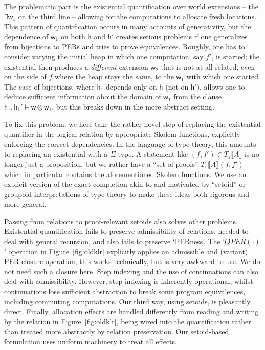 \documentclass[orivec]{llncs}
\newcommand{\eff}{\varepsilon}
\newcommand{\sem}[1]{\ensuremath{\llbracket {#1} \rrbracket}}
\newcommand\w{\ensuremath{\mathsf{w}}\xspace}
\newcommand\heap{\ensuremath{\mathsf{h}}\xspace}
\begin{document}
The problematic part
is the existential quantification over world extensions -- the
$\exists \w_1$ on the third line -- allowing for the computations
to allocate fresh locations.
This pattern of
quantification occurs in many accounts of generativity, but
the dependence of $\w_1$ on both $\heap$ and $\heap'$ creates serious problems
if one generalizes from bijections to PERs
and tries to prove equivalences.
Roughly, one has to consider varying the initial heap in
which one computation, say $f'$, is started; the
existential then produces a \emph{different} extension $\w_2$
that is
not at all related, even on the side of $f$ where the
heap stays the same, to the $\w_1$ with which one started. The
case of bijections, where $\heap_1$ depends only on
$\heap$ (not on $\heap'$), allows one to deduce sufficient information
about the domain of $\w_1$ from the clause $\heap_1,\heap_1'\models \w\otimes\w_1$,
but this breaks down in the more abstract setting.

To fix this problem, we here
take the rather novel step of replacing the existential
quantifier in the logical relation by appropriate Skolem functions,
explicitly enforcing the correct dependencies. In the language of
type theory, this amounts to replacing an existential  with
a $\Sigma$-type. A statement like $(f,f')\in T_\eff\sem{A}$ is no
longer just a proposition, but we rather have a ``set of
proofs'' $T_\eff\sem{A}(f,f')$ which in particular contains
the aforementioned Skolem functions. We use an explicit version of the 
exact-completion \cite{DBLP:conf/mfps/CarboniFS87,DBLP:conf/lics/BirkedalCRS98} akin to and motivated by ``setoid'' or groupoid interpretations of type theory 
\cite{DBLP:conf/lics/HofmannS94,DBLP:journals/jfp/BartheCP03,DBLP:conf/cpp/Voevodsky11} to make these ideas both rigorous and more
general.

Passing from relations to proof-relevant setoids also solves other
problems. Existential quantification fails to preserve admissibility
of relations, needed to deal with general recursion, and also fails to
preserve `PERness'. The `$QPER(\cdot)$' operation in
Figure~\ref{fig:oldklr} explicitly applies an admissible and (variant)
PER closure operation; this works technically, but is very awkward to
use. We do not need such a closure here. Step indexing
\cite{DBLP:conf/esop/Ahmed06,DBLP:conf/icfp/ThamsborgB11} and the use
of continuations \cite{DBLP:conf/mfcs/PittsS93} can also deal with
admissibility.  However, step-indexing is inherently operational,
whilst continuations lose sufficient abstraction to break some program
equivalences, including commuting computations. Our third way, using
setoids, is pleasantly direct. Finally, allocation
effects are handled differently from reading and writing by the
relation in Figure~\ref{fig:oldklr}, being wired into the
quantification rather than treated more abstractly by relation
preservation. Our setoid-based formulation uses uniform machinery to
treat all effects.
\end{document}
